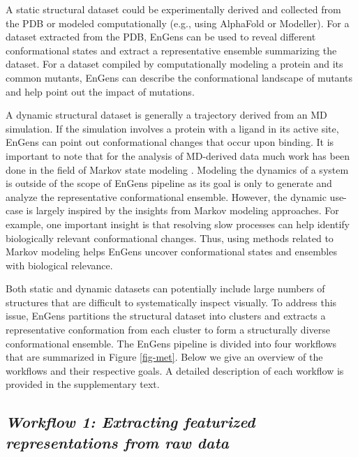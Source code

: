 \documentclass[numsec,webpdf,contemporary,large]{oup-authoring-template}
\theoremstyle{thmstyleone}%
\theoremstyle{thmstyletwo}%
\theoremstyle{thmstylethree}%
\begin{document}
A static structural dataset could be experimentally derived and collected from the PDB or modeled computationally (e.g., using AlphaFold or Modeller). For a dataset extracted from the PDB, EnGens can be used to reveal different conformational states and extract a representative ensemble summarizing the dataset. For a dataset compiled by computationally modeling a protein and its common mutants, EnGens can describe the conformational landscape of mutants and help point out the impact of mutations.

A dynamic structural dataset is generally a trajectory derived from an MD simulation. If the simulation involves a protein with a ligand in its active site, EnGens can point out conformational changes that occur upon binding. It is important to note that for the analysis of MD-derived data much work has been done in the field of Markov state modeling \citep{abella_markov_2020, husic_markov_2018, bernetti_integrated_2019}. Modeling the dynamics of a system is outside of the scope of EnGens pipeline as its goal is only to generate and analyze the representative conformational ensemble. However, the dynamic use-case is largely inspired by the insights from Markov modeling approaches. For example, one important insight is that resolving slow processes can help identify biologically relevant conformational changes. Thus, using methods related to Markov modeling helps EnGens uncover conformational states and ensembles with biological relevance. 

Both static and dynamic datasets can potentially include large numbers of structures that are difficult to systematically inspect visually. To address this issue, EnGens partitions the structural dataset into clusters and extracts a representative conformation from each cluster to form a structurally diverse conformational ensemble. The EnGens pipeline is divided into four workflows that are summarized in Figure \ref{fig-met}. Below we give an overview of the workflows and their respective goals. A detailed description of each workflow is provided in the supplementary text. 


\subsection{\textit{\textbf{Workflow 1:} Extracting featurized representations from raw data}}\label{wf1}
\end{document}
